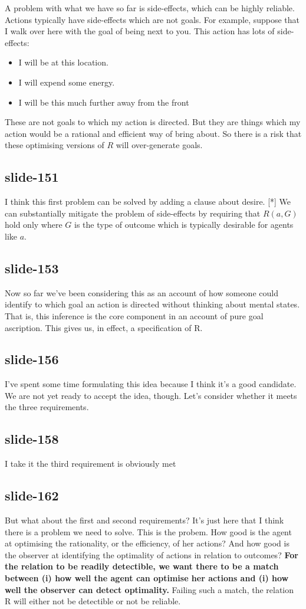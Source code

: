 \documentclass[12pt,\papersize]{extarticle}
\begin{document}
A problem with what we have so far is side-effects, which can be highly reliable.
Actions typically have side-effects which are not goals. For example,
suppose that I walk over here with the goal of being next to you.
This action has lots of side-effects:
\begin{itemize}
\item I will be at this location.
\item I will expend some energy.
\item I will be this much further away from the front
\end{itemize}
These are not goals to which my action is directed.
But they are things which my action would be a rational and efficient way of bring about.
So there is a risk that these optimising versions of $R$ will over-generate goals.
 
 
\subsection{slide-151}
I think this first problem can be solved by adding a clause about desire.
[*] We can substantially mitigate the problem of side-effects by requiring that $R(a,G)$ hold only where $G$ is the type of outcome which is typically desirable for agents like $a$.
 
 
\subsection{slide-153}
Now so far we've been considering this as an account of how someone could identify to which goal an action is directed without thinking about mental states.
That is, this inference is the core component in an account of pure goal ascription.
This gives us, in effect, a specification of R.
 
 
\subsection{slide-156}
I've spent some time formulating this idea because I think it's a good candidate. We are not yet ready to accept the idea, though. Let's consider whether it meets the three requirements.
 
 
\subsection{slide-158}
I take it the third requirement is obviously met
 
 
\subsection{slide-162}
But what about the first and second requirements? It's just here that I think there is a problem we need to solve.
This is the probem. How good is the agent at optimising the rationality, or the efficiency, of her actions? And how good is the observer at identifying the optimality of actions in relation to outcomes? \textbf{ For the relation to be readily detectible, we want there to be a match between (i) how well the agent can optimise her actions and (i) how well the observer can detect optimality.} Failing such a match, the relation R will either not be detectible or not be reliable.
 
\end{document}
